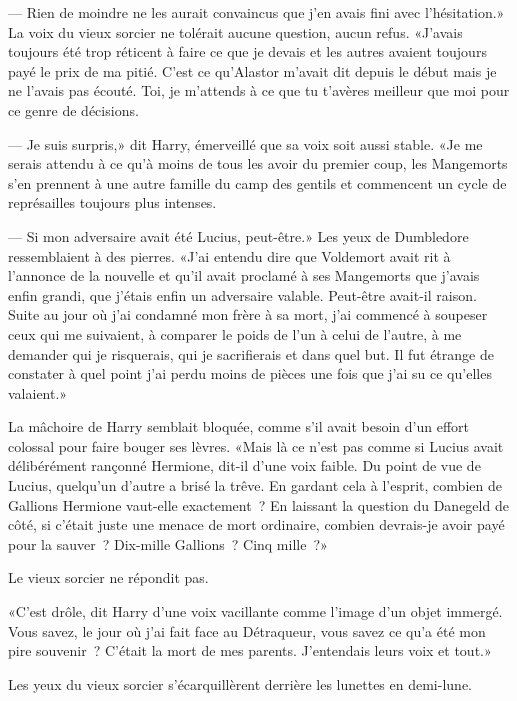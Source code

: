 --- Rien de moindre ne les aurait convaincus que j'en avais fini avec l'hésitation.» La voix du vieux sorcier ne tolérait aucune question, aucun refus. «J'avais toujours été trop réticent à faire ce que je devais et les autres avaient toujours payé le prix de ma pitié. C'est ce qu'Alastor m'avait dit depuis le début mais je ne l'avais pas écouté. Toi, je m'attends à ce que tu t'avères meilleur que moi pour ce genre de décisions.

--- Je suis surpris,» dit Harry, émerveillé que sa voix soit aussi stable. «Je me serais attendu à ce qu'à moins de tous les avoir du premier coup, les Mangemorts s'en prennent à une autre famille du camp des gentils et commencent un cycle de représailles toujours plus intenses.

--- Si mon adversaire avait été Lucius, peut-être.» Les yeux de Dumbledore ressemblaient à des pierres. «J'ai entendu dire que Voldemort avait rit à l'annonce de la nouvelle et qu'il avait proclamé à ses Mangemorts que j'avais enfin grandi, que j'étais enfin un adversaire valable. Peut-être avait-il raison. Suite au jour où j'ai condamné mon frère à sa mort, j'ai commencé à soupeser ceux qui me suivaient, à comparer le poids de l'un à celui de l'autre, à me demander qui je risquerais, qui je sacrifierais et dans quel but. Il fut étrange de constater à quel point j'ai perdu moins de pièces une fois que j'ai su ce qu'elles valaient.»

La mâchoire de Harry semblait bloquée, comme s'il avait besoin d'un effort colossal pour faire bouger ses lèvres. «Mais là ce n'est pas comme si Lucius avait délibérément rançonné Hermione, dit-il d'une voix faible. Du point de vue de Lucius, quelqu'un d'autre a brisé la trêve. En gardant cela à l'esprit, combien de Gallions Hermione vaut-elle exactement~? En laissant la question du Danegeld de côté, si c'était juste une menace de mort ordinaire, combien devrais-je avoir payé pour la sauver~? Dix-mille Gallions~? Cinq mille~?»

Le vieux sorcier ne répondit pas.

«C'est drôle, dit Harry d'une voix vacillante comme l'image d'un objet immergé. Vous savez, le jour où j'ai fait face au Détraqueur, vous savez ce qu'a été mon pire souvenir~? C'était la mort de mes parents. J'entendais leurs voix et tout.»

Les yeux du vieux sorcier s'écarquillèrent derrière les lunettes en demi-lune.

